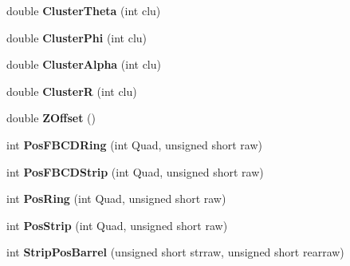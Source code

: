\begin{DoxyCompactItemize}
double {\bfseries Cluster\+Theta} (int clu)
\item 
\mbox{\label{class_calibration_a7d041b9f530257c9f717bcaaaef4b200}} 
double {\bfseries Cluster\+Phi} (int clu)
\item 
\mbox{\label{class_calibration_ad2ead82be397c3017dd98e490232abd2}} 
double {\bfseries Cluster\+Alpha} (int clu)
\item 
\mbox{\label{class_calibration_ae30896b904d2d041f4b76effe283bc93}} 
double {\bfseries ClusterR} (int clu)
\item 
\mbox{\label{class_calibration_ada9c3b036839143214a5e41b90f2a78e}} 
double {\bfseries Z\+Offset} ()
\item 
\mbox{\label{class_calibration_a65ab7c201643a2bc8cb366b9ac20ab3b}} 
int {\bfseries Pos\+F\+B\+C\+D\+Ring} (int Quad, unsigned short raw)
\item 
\mbox{\label{class_calibration_a9ee9ef612f7485f5371916bf524bb036}} 
int {\bfseries Pos\+F\+B\+C\+D\+Strip} (int Quad, unsigned short raw)
\item 
\mbox{\label{class_calibration_a240b3ac33e55af3f762d2cecc5d06b2b}} 
int {\bfseries Pos\+Ring} (int Quad, unsigned short raw)
\item 
\mbox{\label{class_calibration_a1d12aea9e2be55852b937e8be3ffbae1}} 
int {\bfseries Pos\+Strip} (int Quad, unsigned short raw)
\item 
\mbox{\label{class_calibration_af2ce93c038cdfd3e9fb1e4ffa093097c}} 
int {\bfseries Strip\+Pos\+Barrel} (unsigned short strraw, unsigned short rearraw)
\end{DoxyCompactItemize}
